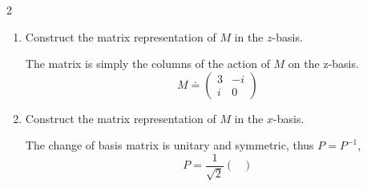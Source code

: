 \documentclass[11pt]{article}
\begin{document}
\begin{problem}{2}
\begin{enumerate}[label=(\alph*)]
\begin{answer}
          \begin{equation}
          \label{eq:23}
          \begin{aligned}
            \begin{pmatrix}
3  & -i \\
i  & 0
 \end{pmatrix} \begin{pmatrix}
v_1 \\
v_2
 \end{pmatrix} = \lambda_{\pm} \begin{pmatrix}
v_1 \\
v_2
 \end{pmatrix} = \begin{pmatrix}
3v_1 - iv_2 \\
iv_{1}
 \end{pmatrix} \implies i v_1 = \lambda_{\pm} v_2.
          \end{aligned}
          \end{equation}
          Setting \( v_1 = \lambda_{\pm} \), we get \( v_2 = i \). Normalizing the states, the eigenvectors are
          \begin{equation}
          \label{eq:24}
          \ket{\lambda_{\pm}} = \frac{1}{\sqrt{\lambda_{\pm}^2 + 1}} \begin{pmatrix}
\lambda_{\pm} \\
i
 \end{pmatrix}.
          \end{equation}
          \end{answer}
    \item Construct the matrix representation of \( M \) in the \( z \)-basis.
          \begin{answer} The matrix is simply the columns of the action of \( M \) on the z-basis.
\begin{equation}
\label{eq:14}
M \doteq \begin{pmatrix}
3  & -i \\
i  & 0
 \end{pmatrix}
\end{equation}
          \end{answer}
    \item Construct the matrix representation of \( M \) in the \( x \)-basis.
          \begin{answer}
            The change of basis matrix is unitary and symmetric, thus \( P = P^{-1} \),
            \begin{equation}
            \label{eq:20}
            P = \frac{1}{\sqrt{2}}\begin{pmatrix}

\end{pmatrix}
\end{equation}
\end{answer}
\end{enumerate}
\end{problem}
\end{document}

